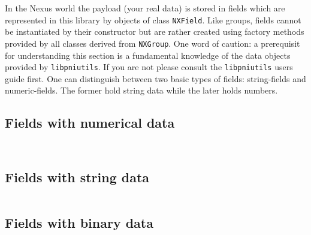 
In the Nexus world the payload (your real data) is stored in fields which 
are represented in this library by objects of class {\tt NXField}.
Like groups, fields cannot be instantiated by their constructor but are 
rather created using factory methods provided by all classes derived 
from  {\tt NXGroup}. One word of caution: a prerequisit for understanding 
this section is a fundamental knowledge of the data objects provided 
by {\tt libpniutils}. If you are not please consult the {\tt libpniutils}
users guide first.
One can distinguish between two basic types of fields: string-fields
and numeric-fields. The former hold string data while the later 
holds numbers.   


\subsection{Fields with numerical data}
\label{section:nxfield_numeric_io}

\inputminted[linenos=true]{c++}{../examples/c++/nxnumfield_ex1.cpp}
\inputminted[linenos=true]{c++}{../examples/c++/nxnumfield_ex2.cpp}

\subsection{Fields with string data}
\label{section:nxfield_string_io}

\inputminted[linenos=true]{c++}{../examples/c++/nxstrfield_ex2.cpp}

\subsection{Fields with binary data}
\label{section:nxfield_binary_io}

\inputminted[linenos,firstline=1,lastline=24]{c++}{../examples/c++/nxbinfield_ex1.cpp}
\inputminted[linenos,firstnumber=27,firstline=27,lastline=44]{c++}{../examples/c++/nxbinfield_ex1.cpp}
\inputminted[linenos,firstnumber=47,firstline=47,lastline=56]{c++}{../examples/c++/nxbinfield_ex1.cpp}
